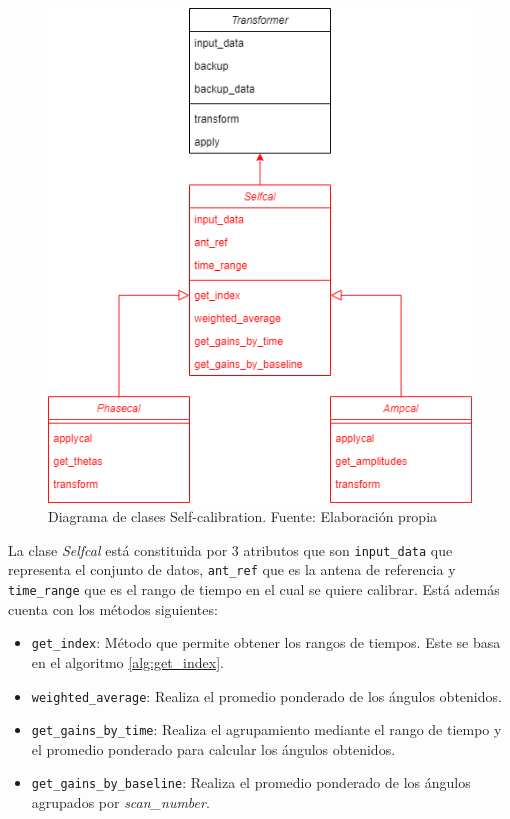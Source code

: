 \begin{figure}[!ht]
	\centering
	\captionsetup{justification=centering}
	\includegraphics[scale=0.4]{images/Pyralysis-Self-calibration.png}
	\caption[Diagrama de clases Self-calibration]{Diagrama de clases Self-calibration. Fuente: Elaboración propia}
	\label{fig:selfcal_diagram}
\end{figure}

La clase \textit{Selfcal} está constituida por 3 atributos que son \texttt{input\_data} que representa el conjunto de datos, \texttt{ant\_ref} que es la antena de referencia y \texttt{time\_range} que es el rango de tiempo en el cual se quiere calibrar. Está además cuenta con los métodos siguientes: 

\begin{itemize}
    \item \texttt{get\_index}: Método que permite obtener los rangos de tiempos. Este se basa en el algoritmo \ref{alg:get_index}.
    \item \texttt{weighted\_average}: Realiza el promedio ponderado de los ángulos obtenidos.
    \item \texttt{get\_gains\_by\_time}: Realiza el agrupamiento mediante el rango de tiempo y el promedio ponderado para calcular los ángulos obtenidos. 
    \item \texttt{get\_gains\_by\_baseline}: Realiza el promedio ponderado de los ángulos agrupados por \textit{scan\_number}.
\end{itemize}

